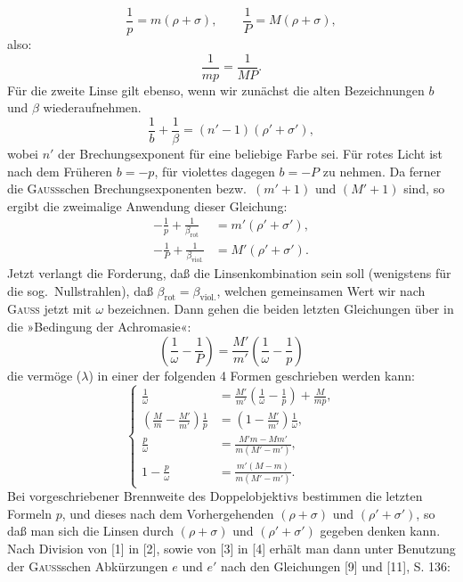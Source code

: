 \[\frac1p=m(\rho+\sigma),\qquad\frac1P=M(\rho+\sigma),\]
\noindent also:
\begin{equation*}\tag*{($\lambda$)}\frac1{mp}=\frac1{MP}.\end{equation*}
\noindent Für die zweite Linse gilt ebenso, wenn wir zunächst die alten Bezeichnungen $b$ und $\beta$ wiederaufnehmen.
\[\frac1b+\frac1\beta=(n'-1)(\rho'+\sigma'),\]
\noindent wobei $n'$ der Brechungsexponent für eine beliebige Farbe sei. Für rotes Licht ist nach dem Früheren $b=-p$, für violettes dagegen $b=-P$ zu nehmen. Da ferner die \textsc{Gauss}schen Brechungsexponenten bezw.\ $(m'+1)$ und $(M'+1)$ sind, so ergibt die zweimalige Anwendung dieser Gleichung:
\[\begin{aligned}
-\frac1p+\frac1{\beta_{\mathrm{rot}}}&=m'(\rho'+\sigma'),\\[4pt]
-\frac1P+\frac1{\beta_{\mathrm{viol.}}}&=M'(\rho'+\sigma').
\end{aligned}\]
\noindent Jetzt verlangt die Forderung, daß die Linsenkombination  sein soll (wenigstens für die sog.\ Nullstrahlen), daß $\beta_{\mathrm{rot}}=\beta_{\mathrm{viol.}}$, welchen gemeinsamen Wert wir nach \textsc{Gauss} jetzt mit $\omega$ bezeichnen. Dann gehen die beiden letzten Gleichungen über in die »Bedingung der Achromasie«:
\[\left(\frac1\omega-\frac1P\right)=\frac{M'}{m'}\left(\frac1\omega-\frac1p\right)\]
\clearpage{}
\noindent die vermöge ($\lambda$) in einer der folgenden 4 Formen geschrieben werden kann:
\begin{equation*}\tag*{($\mu$)}
\left\{\begin{aligned}
\frac1\omega&=\frac{M'}{m'}\left(\frac1\omega-\frac1p\right)+\frac M{mp},\\[4pt]
\left(\frac Mm-\frac{M'}{m'}\right)\frac1p&=\left(1-\frac{M'}{m'}\right)\frac1\omega,\\[4pt]
\frac p\omega&=\frac{M'm-Mm'}{m(M'-m')},\\[4pt]
1-\frac p\omega&=\frac{m'(M-m)}{m(M'-m')}.
\end{aligned}\right.
\end{equation*}
\noindent Bei vorgeschriebener Brennweite des Doppelobjektivs bestimmen die letzten Formeln $p$, und dieses nach dem Vorhergehenden $(\rho+\sigma)$ und $(\rho'+\sigma')$, so daß man sich die Linsen durch $(\rho+\sigma)$ und $(\rho'+\sigma')$ gegeben denken kann. Nach Division von [1] in [2], sowie von [3] in [4] erhält man dann unter Benutzung der \textsc{Gauss}schen Abkürzungen $e$ und $e'$ nach den Gleichungen [9] und [11], S. 136:
